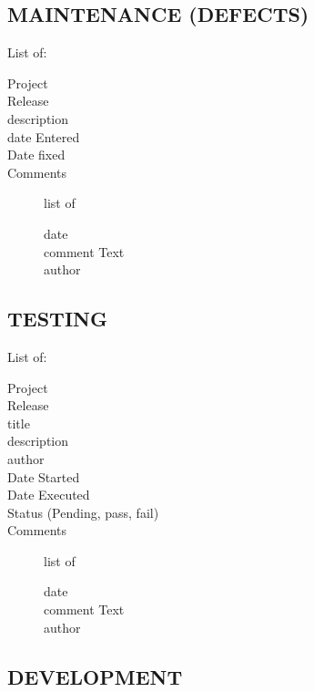 \documentclass[SDSUThesis.tex]{subfiles}
\begin{document}
    \subsection{MAINTENANCE (DEFECTS)}
    List of:
    \begin{description}
      \item[Project] 
      \item[Release]
      \item[description]
      \item[date Entered]
      \item[Date fixed]
      \item[Comments] list of \\
      \begin{description}
        \item[date]
        \item[comment Text]
        \item[author]
      \end{description}
    \end{description}
    
    
    
    \subsection{TESTING}
    
    List of:
    \begin{description}
      \item[Project] 
      \item[Release]
      \item[title]
      \item[description]
      \item[author]
      \item[Date Started]
      \item[Date Executed]
      \item[Status (Pending, pass, fail)]
      \item[Comments] list of \\
      \begin{description}
        \item[date]
        \item[comment Text]
        \item[author]
      \end{description}
    \end{description}
    
    \subsection{DEVELOPMENT}
    
\end{document}
